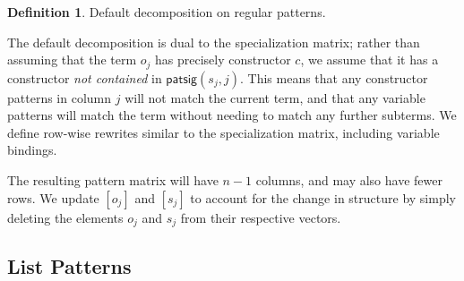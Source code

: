 \documentclass{article}
\theoremstyle{definition}
\newtheorem{definition}{Definition}[section]
\newcommand{\patsig}{\mathsf{patsig}}
\begin{document}
\begin{definition}{Default decomposition on regular patterns.}

The default decomposition is dual to the specialization matrix; rather than
assuming that the term $ o_j $ has precisely constructor $ c $, we assume that
it has a constructor \emph{not contained} in $ \patsig(s_j, j) $. This
means that any constructor patterns in column $ j $ will not match the current
term, and that any variable patterns will match the term without needing to
match any further subterms. We define row-wise rewrites similar to the
specialization matrix, including variable bindings.






The resulting pattern matrix will have $ n - 1 $ columns, and may also have
fewer rows. We update $ [o_j] $ and $ [s_j] $ to account for the change in
structure by simply deleting the elements $ o_j $ and $ s_j $ from their
respective vectors.

\end{definition}



\subsection{List Patterns} \label{sec:decomp:list}
\end{document}
